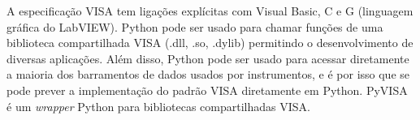 A especificação VISA tem ligações explícitas com Visual Basic, C e G (linguagem gráfica do LabVIEW). Python pode ser usado para chamar funções de uma biblioteca compartilhada VISA (.dll, .so, .dylib) permitindo o desenvolvimento de diversas aplicações. Além disso, Python pode ser usado para acessar diretamente a maioria dos barramentos de dados usados por instrumentos, e é por isso que se pode prever a implementação do padrão VISA diretamente em Python. PyVISA é um \textit{wrapper} Python para bibliotecas compartilhadas VISA.\cite{pyvisaRef}

